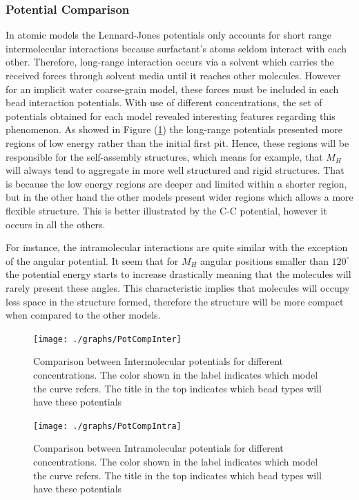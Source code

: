 \documentclass[10pt,a4paper,twoside]{article}
\begin{document}
\subsubsection{Potential Comparison}

In atomic models the Lennard-Jones potentials  only accounts for short range intermolecular interactions because surfactant's atoms seldom interact with each other. Therefore, long-range interaction occurs via a solvent which carries the received forces through solvent media until it reaches other molecules. However for an implicit water coarse-grain model, these forces must be included in each bead interaction potentials. With use of different concentrations, the set of potentials obtained for each model revealed interesting features regarding this phenomenon. As showed in Figure (\ref{Fig:PotCompInter}) the long-range potentials presented more regions of low energy rather than the initial first pit. Hence, these regions will be responsible for the self-assembly structures, which means for example, that $M_H$ will always tend to aggregate in more well structured and rigid structures. That is because the low energy regions are deeper and limited within a shorter region, but in the other hand the other models present wider regions which allows a more flexible structure. This is better illustrated by the C-C potential, however it occurs in all the others.


For instance, the intramolecular interactions are quite similar with the exception of the angular potential. It seem that for $M_H$ angular positions smaller than $120^{\circ}$ the potential energy starts to increase drastically meaning that the molecules will rarely present these angles. This characteristic implies that molecules will occupy less space in the structure formed, therefore the structure  will be more compact when compared to the other models.

\begin{figure}[H]
  \begin{center}
	\texttt{[image: ./graphs/PotCompInter]}
	\caption{Comparison between Intermolecular potentials for different concentrations. The color shown in the label indicates which model the curve refers. The title in the top indicates which bead types will have these potentials}
	\label{Fig:PotCompInter}
  \end{center}
\end{figure} 

\begin{figure}[H]
  \begin{center}
	\texttt{[image: ./graphs/PotCompIntra]}
	\caption{Comparison between Intramolecular potentials for different concentrations. The color shown in the label indicates which model the curve refers. The title in the top indicates which bead types will have these potentials}
	\label{Fig:PotCompIntra}
  \end{center}
\end{figure} 
  
\end{document}
